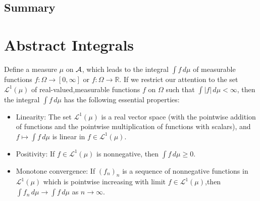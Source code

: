 \documentclass{report}
\begin{document}
{\section{Summary}
\chapter{Abstract Integrals}
Define a measure $\mu$ on $\mathcal A$, which leads to the integral $\int f\,d\mu$ of measurable functions $f:\Omega\to[0,\infty]$ or $f:\Omega\to\mathbb{R}$. If we restrict our attention to the set $\mathcal{L}^1(\mu)$ of real-valued,measurable functions $f$ on $\Omega$ such that $\int|f|\,d\mu<\infty$, then the integral $\int f\,d\mu$ has the following essential properties:
\begin{itemize}
    \item Linearity: The set $\mathcal{L}^1(\mu)$ is a real vector space (with the pointwise addition of functions and the pointwise multiplication of functions with scalars), and $f\mapsto \int f\,d\mu$ is linear in $f\in\mathcal{L}^1(\mu)$.
    \item Positivity: If $f\in\mathcal{L}^1(\mu)$ is nonnegative, then $\int f\,d\mu\geq 0$.
    \item Monotone convergence: If $(f_n)_n$ is a sequence of nonnegative functions in $\mathcal{L}^1(\mu)$ which is pointwise increasing with limit $f\in\mathcal{L}^1(\mu)$,then $\int f_n\,d\mu\to\int f\,d\mu$ as $n\to\infty$.
\end{itemize}
}
\end{document}
